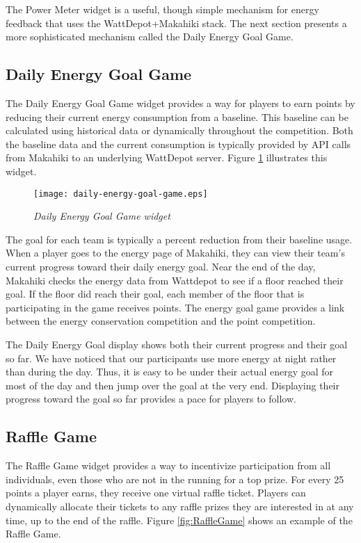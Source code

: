 The Power Meter widget is a useful, though simple mechanism for energy feedback that uses the WattDepot+Makahiki stack.   The next section presents a more sophisticated mechanism called the Daily Energy Goal Game.

\subsection{Daily Energy Goal Game}

The Daily Energy Goal Game widget provides a way for players to earn points by reducing their current energy consumption from a baseline. This baseline can be calculated using historical data or dynamically throughout the competition. Both the baseline data and the current consumption is typically provided by API calls from Makahiki to an underlying WattDepot server.
Figure \ref{fig:DailyEnergyGoal} illustrates this widget.

\begin{figure}[th]
  \center
  \texttt{[image: daily-energy-goal-game.eps]}
  \caption{\em Daily Energy Goal Game widget}
  \label{fig:DailyEnergyGoal}
\end{figure}

The goal for each team is typically a percent reduction from their baseline usage. When a player goes to the energy page of Makahiki, they can view their team's current progress toward their daily energy goal. Near the end of the day, Makahiki checks the energy data from Wattdepot to see if a floor reached their goal. If the floor did reach their goal, each member of the floor that is participating in the game receives points. The energy goal game provides a link between the energy conservation competition and the point competition.

The Daily Energy Goal display shows both their current progress and their goal so far. We have noticed that our participants use more energy at night rather than during the day. Thus, it is easy to be under their actual energy goal for most of the day and then jump over the goal at the very end. Displaying their progress toward the goal so far provides a pace for players to follow.

\subsection{Raffle Game}

The Raffle Game widget provides a way to incentivize participation from all individuals, even those who are not in the running for a top prize. For every 25 points a player earns, they receive one virtual raffle ticket. Players can dynamically allocate their tickets to any raffle prizes they are interested in at any time, up to the end of the raffle. Figure \ref{fig:RaffleGame} shows an example of the Raffle Game.


